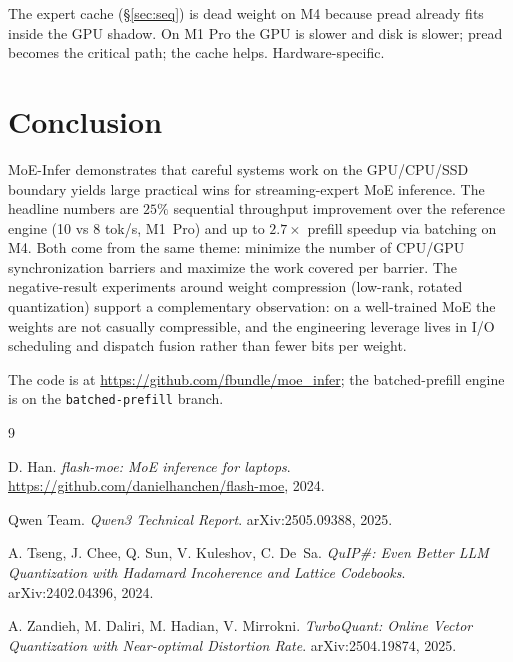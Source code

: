 \documentclass[11pt,a4paper]{article}
\begin{document}
The expert cache (\S\ref{sec:seq}) is dead weight on M4 because pread
already fits inside the GPU shadow. On M1 Pro the GPU is slower and
disk is slower; pread becomes the critical path; the cache helps.
Hardware-specific.

\section{Conclusion}

MoE-Infer demonstrates that careful systems work on the GPU/CPU/SSD
boundary yields large practical wins for streaming-expert MoE
inference. The headline numbers are $25\%$ sequential throughput
improvement over the reference engine (10 vs 8 tok/s, M1~Pro) and up
to $2.7\times$ prefill speedup via batching on M4. Both come from the
same theme: minimize the number of CPU/GPU synchronization barriers
and maximize the work covered per barrier. The negative-result
experiments around weight compression (low-rank, rotated quantization)
support a complementary observation: on a well-trained MoE the
weights are not casually compressible, and the engineering leverage
lives in I/O scheduling and dispatch fusion rather than fewer bits per
weight.

The code is at
\url{https://github.com/fbundle/moe_infer}; the batched-prefill engine
is on the \texttt{batched-prefill} branch.

\begin{thebibliography}{9}

  D. Han. \emph{flash-moe: MoE inference for laptops}.
  \url{https://github.com/danielhanchen/flash-moe}, 2024.

  Qwen Team. \emph{Qwen3 Technical Report}. arXiv:2505.09388, 2025.

  A. Tseng, J. Chee, Q. Sun, V. Kuleshov, C. De~Sa.
  \emph{QuIP\#: Even Better LLM Quantization with Hadamard Incoherence
  and Lattice Codebooks}. arXiv:2402.04396, 2024.

  A. Zandieh, M. Daliri, M. Hadian, V. Mirrokni.
  \emph{TurboQuant: Online Vector Quantization with Near-optimal
  Distortion Rate}. arXiv:2504.19874, 2025.

\end{thebibliography}
\end{document}
